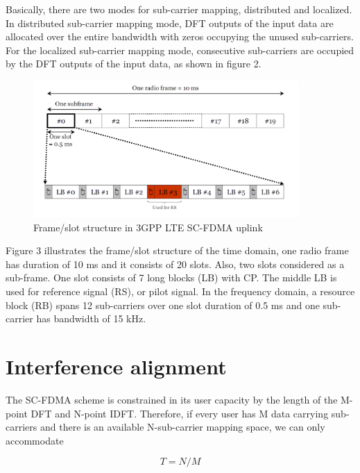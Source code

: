 \documentclass[12pt,a4paper,notitlepage,twoside,headsepline]{scrartcl}
\begin{document}
Basically, there are two modes for sub-carrier mapping, distributed and localized.  In distributed sub-carrier mapping mode, DFT outputs of the input data are allocated over the entire bandwidth with zeros occupying the unused sub-carriers. For the localized sub-carrier mapping mode, consecutive sub-carriers are occupied by the DFT outputs of the input data, as shown in figure 2.


\begin{figure}[!ht]
\begin{center}
\includegraphics[width=0.9\textwidth]{figures/fig3}
\end{center}
\caption{Frame/slot structure in 3GPP LTE SC-FDMA uplink} 
\label{fig:example}
\end{figure}


Figure 3 illustrates the frame/slot structure of the time domain, one radio frame has duration of 10 ms and it consists of 20 slots. Also, two slots considered as a sub-frame. One slot consists of 7 long blocks (LB) with CP. The middle LB is used for reference signal (RS), or pilot signal. In the frequency domain, a resource block (RB) spans 12 sub-carriers over one slot duration of 0.5 ms and one sub-carrier has bandwidth of 15 kHz.


\section{Interference alignment}

The SC-FDMA scheme is constrained in its user capacity by the length of the M-point DFT and N-point IDFT. Therefore, if every user has M data carrying sub-carriers and there is an available N-sub-carrier mapping space, we can only accommodate

\begin{equation}
	T = N/M
\end{equation}
\end{document}
